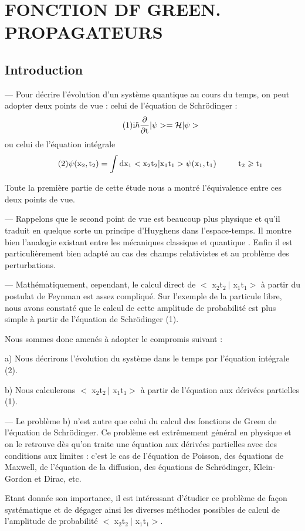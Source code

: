 \chapter{FONCTION DF GREEN. PROPAGATEURS}%
\section{Introduction}%
— Pour décrire l'évolution d'un système quantique au cours
du temps, on peut adopter deux points de vue : celui de l'équation de
Schrödinger :
\[
\tag{1}\text{i}\hbar\frac{\partial}{\partial\text{t}}|\psi>=\mathcal{H}|\psi>
\]
ou celui de l'équation intégrale
\[
\tag{2}\psi(\text{x}_2,\text{t}_2)=\int\text{dx}_1<\text{x}_2\text{t}_2|\text{x}_1\text{t}_1>\psi(\text{x}_1,\text{t}_1)
\ \ \ \ \ \ \ \ \text{t}_2\geqslant\text{t}_1
\]

Toute la première partie de cette étude nous a montré l'équivalence entre ces deux points de vue.

— Rappelons que le second point de vue est beaucoup plus physique
et qu'il traduit en quelque sorte un principe d'Huyghens dans l'espace-temps.
Il montre bien l'analogie existant entre les mécaniques classique et quantique . Enfin il est particulièrement bien adapté au cas des champs relativistes et au problème des perturbations.

— Mathématiquement, cependant, le calcul direct de $<$ x$_2$t$_2\ |$ x$_1$t$_1>$
à partir du postulat de Feynman est assez compliqué. Sur l'exemple de la
particule libre, nous avons constaté que le calcul de cette amplitude de
probabilité est plus simple à partir de l'équation de Schrödinger (1).

Nous sommes donc amenés à adopter le compromis suivant :

a) Nous décrirons l'évolution du système dans le temps par l'équation intégrale (2).

b) Nous calculerons $<$ x$_2$t$_2\ |$ x$_1$t$_1>$ à partir de l'équation aux dérivées partielles (1).

 
— Le problème b) n'est autre que celui du calcul des fonctions
de Green de l'équation de Schrödinger. Ce problème est extrêmement général
en physique et on le retrouve dès qu'on traite une équation aux dérivées
partielles avec des conditions aux limites : c'est le cas de l'équation
de Poisson, des équations de Maxwell, de l'équation de la diffusion, des
équations de Schrödinger, Klein-Gordon et Dirac, etc.

Etant donnée son importance, il est intéressant d'étudier ce
problème de façon systématique et de dégager ainsi les diverses méthodes
possibles de calcul de l'amplitude de probabilité $<$ x$_2$t$_2\ |$ x$_1$t$_1>$.
